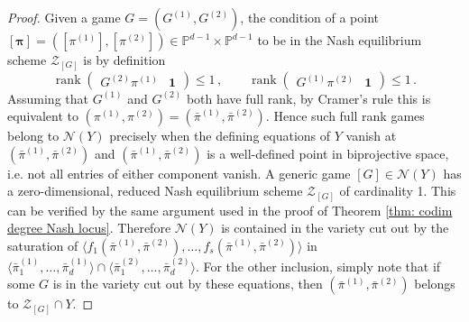 \documentclass[12pt]{article}
\theoremstyle{definition}
\newcommand{\PP}{{\mathbb P}}
\def\bpi{{\boldsymbol{\pi}}}
\def\bone{{\boldsymbol{1}}}
\def\rank{\operatorname{rank}}
\newcommand{\kn}{{\mathcal N}}
\newcommand{\kz}{{\mathcal Z}}
\begin{document}
\begin{proof}
Given a game $G=(G^{(1)},G^{(2)})$, the condition of a point $[\bpi]=([\pi^{(1)}],[\pi^{(2)}])\in\PP^{d-1}\times \PP^{d-1}$ to be in the Nash equilibrium scheme $\kz_{[G]}$ is by definition
\[
    \rank\begin{pmatrix}G^{(2)}\pi^{(1)} &\bone\end{pmatrix}\le 1\,,\quad\quad\rank\begin{pmatrix}G^{(1)}\pi^{(2)} &\bone\end{pmatrix}\le 1\,.
\]
Assuming that $G^{(1)}$ and $G^{(2)}$ both have full rank, by Cramer's rule this is equivalent to $(\pi^{(1)},\pi^{(2)})=(\bar{\pi}^{(1)},\bar{\pi}^{(2)})$. Hence such full rank games belong to $\kn(Y)$ precisely when the defining equations of $Y$ vanish at $(\bar{\pi}^{(1)},\bar{\pi}^{(2)})$ and $(\bar{\pi}^{(1)},\bar{\pi}^{(2)})$ is a well-defined point in biprojective space, i.e. not all entries of either component vanish. A generic game $[G]\in\kn(Y)$ has a zero-dimensional, reduced Nash equilibrium scheme $\kz_{[G]}$ of cardinality 1. This can be verified by the same argument used in the proof of Theorem \ref{thm: codim degree Nash locus}. Therefore $\kn(Y)$ is contained in the variety cut out by the saturation of $\langle f_1(\bar{\pi}^{(1)},\bar{\pi}^{(2)}),\ldots,f_s(\bar{\pi}^{(1)},\bar{\pi}^{(2)})\rangle$ in $\langle \bar{\pi}^{(1)}_1,\dots,\bar{\pi}^{(1)}_d\rangle \cap \langle\bar{\pi}^{(2)}_1,\dots,\bar{\pi}^{(2)}_d\rangle$. For the other inclusion, simply note that if some $G$ is in the variety cut out by these equations, then $(\bar{\pi}^{(1)},\bar{\pi}^{(2)})$ belongs to $\kz_{[G]}\cap Y$.
\end{proof}
\end{document}
